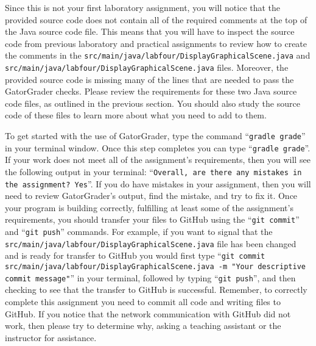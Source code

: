 \documentclass[11pt]{article}
\newcommand{\mainprogramsource}{\lstinline{src/main/java/labfour/DisplayGraphicalScene.java}}
\newcommand{\secondprogramsource}{\lstinline{src/main/java/labfour/DisplayGraphicalScene.java}}
\newcommand{\gatorgraderstart}{\command{gradle grade}}
\newcommand{\gatorgradercheck}{\command{gradle grade}}
\newcommand{\gitcommit}{\command{git commit}}
\newcommand{\gitpush}{\command{git push}}
\newcommand{\gitcommitmainprogram}{\command{git commit src/main/java/labfour/DisplayGraphicalScene.java -m "Your
descriptive commit message"}}
\newcommand{\command}[1]{``\lstinline{#1}''}
\begin{document}
Since this is not your first laboratory assignment, you will notice that the provided source code does not contain all of
the required comments at the top of the Java source code file. This means that you will have to inspect the source code
from previous laboratory and practical assignments to review how to create the comments in the \mainprogramsource{} and
\secondprogramsource{} files. Moreover, the provided source code is missing many of the lines that are needed to pass
the GatorGrader checks. Please review the requirements for these two Java source code files, as outlined in the previous
section. You should also study the source code of these files to learn more about what you need to add to them.

To get started with the use of GatorGrader, type the command \gatorgraderstart{} in your terminal window. Once this step
completes you can type \gatorgradercheck{}. If your work does not meet all of the assignment's requirements, then you
will see the following output in your terminal: \command{Overall, are there any mistakes in the assignment? Yes}. If you
do have mistakes in your assignment, then you will need to review GatorGrader's output, find the mistake, and try to fix
it. Once your program is building correctly, fulfilling at least some of the assignment's requirements, you should
transfer your files to GitHub using the \gitcommit{} and \gitpush{} commands. For example, if you want to signal that
the \mainprogramsource{} file has been changed and is ready for transfer to GitHub you would first type
\gitcommitmainprogram{} in your terminal, followed by typing \gitpush{}, and then checking to see that the transfer to
GitHub is successful. Remember, to correctly complete this assignment you need to commit all code and writing files to
GitHub. If you notice that the network communication with GitHub did not work, then please try to determine why, asking
a teaching assistant or the instructor for assistance.
\end{document}
